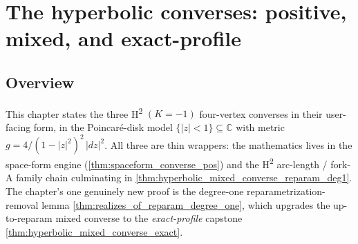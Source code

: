 \chapter{The hyperbolic converses: positive, mixed, and exact-profile}
\label{chap:hyperbolic_converse}


\section{Overview}

This chapter states the three H\textsuperscript{2} $(K=-1)$ four-vertex
converses in their user-facing form, in the Poincar\'e-disk model
$\{|z|<1\}\subseteq\mathbb C$ with metric $g=4/(1-|z|^2)^2\,|dz|^2$. All three
are thin wrappers: the mathematics lives in the space-form engine
(\cref{thm:spaceform_converse_pos}) and the H\textsuperscript{2} arc-length /
fork-A family chain culminating in
\cref{thm:hyperbolic_mixed_converse_reparam_deg1}. The chapter's one genuinely
new proof is the degree-one reparametrization-removal lemma
\cref{thm:realizes_of_reparam_degree_one}, which upgrades the up-to-reparam
mixed converse to the \emph{exact-profile} capstone
\cref{thm:hyperbolic_mixed_converse_exact}.

